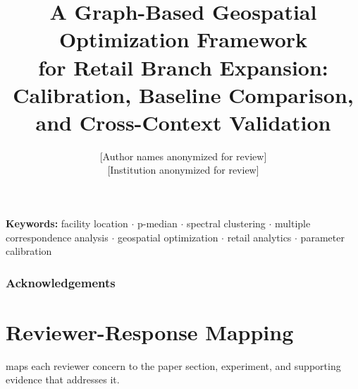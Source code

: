 \documentclass[11pt,a4paper]{article}
\newenvironment{keywords}{\par\smallskip\noindent\textbf{Keywords:} }{\par}
\begin{document}
\title{\textbf{A Graph-Based Geospatial Optimization Framework\\
       for Retail Branch Expansion:\\[4pt]
       Calibration, Baseline Comparison, and Cross-Context Validation}}

\author{[Author names anonymized for review]\\
        \small [Institution anonymized for review]}

\date{}
\maketitle

\begin{abstract}

\end{abstract}

\begin{keywords}
facility location $\cdot$ p-median $\cdot$ spectral clustering $\cdot$
multiple correspondence analysis $\cdot$ geospatial optimization $\cdot$
retail analytics $\cdot$ parameter calibration
\end{keywords}








\subsubsection*{Acknowledgements}





\appendix
\section{Reviewer-Response Mapping}
\label{app:reviewer}

 maps each reviewer concern to the paper section,
experiment, and supporting evidence that addresses it.

\begin{table}[h]
  \centering
  \caption{Reviewer-response mapping.}
  \label{tab:reviewer}
  \small
  
\end{table}
\end{document}
